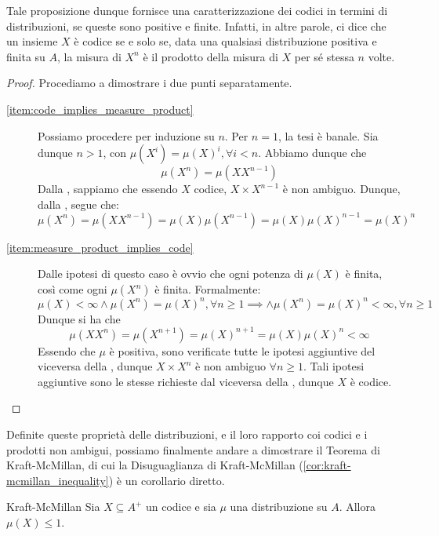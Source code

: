 Tale proposizione dunque fornisce una caratterizzazione dei codici in termini di distribuzioni, se queste sono positive e finite.
Infatti, in altre parole, ci dice che un insieme \(X\) è codice se e solo se, data una qualsiasi distribuzione positiva e finita su \(A\), la misura di \(X^n\) è il prodotto della misura di \(X\) per sé stessa \(n\) volte.
\begin{proof}
  Procediamo a dimostrare i due punti separatamente.
  \begin{description}
    \item[\ref{item:code_implies_measure_product}] Possiamo procedere per induzione su \(n\).
      Per \(n=1\), la tesi è banale.
      Sia dunque \(n>1\), con \(\mu(X^i) = {\mu(X)}^i, \forall i < n\).
      Abbiamo dunque che 
      \[\mu(X^n)=\mu(XX^{n-1})\]
      Dalla , sappiamo che essendo \(X\) codice, \(X \times X^{n-1}\) è non ambiguo.
      Dunque, dalla , segue che:
      \[\mu(X^n)=\mu(XX^{n-1}) = \mu(X)\mu(X^{n-1}) = \mu(X) {\mu(X)}^{n-1} = {\mu(X)}^n\]

    \item[\ref{item:measure_product_implies_code}] Dalle ipotesi di questo caso è ovvio che ogni potenza di \(\mu(X)\) è finita, così come ogni \(\mu(X^n)\) è finita.
    Formalmente:
    \[\mu(X)<\infty \land \mu(X^n) = {\mu(X)}^n, \forall n \geq 1 \implies \land \mu(X^n) = {\mu(X)}^n < \infty, \forall n \geq 1\]
    Dunque si ha che
    \[\mu(XX^n) = \mu(X^{n+1}) = {\mu(X)}^{n+1} = \mu(X){\mu(X)}^n < \infty\]
    Essendo che \(\mu\) è positiva, sono verificate tutte le ipotesi aggiuntive del viceversa della , dunque \(X \times X^n\) è non ambiguo \(\forall n \geq 1\).
    Tali ipotesi aggiuntive sono le stesse richieste dal viceversa della , dunque \(X\) è codice.
  \end{description}
\end{proof}
Definite queste proprietà delle distribuzioni, e il loro rapporto coi codici e i prodotti non ambigui, possiamo finalmente andare a dimostrare il Teorema di Kraft-McMillan, di cui la Disuguaglianza di Kraft-McMillan (\ref{cor:kraft-mcmillan_inequality}) è un corollario diretto.

\begin{theorem}[label=thm:kraft-mcmillan]{Kraft-McMillan}
  Sia \(X \subseteq A^+\) un codice e sia \(\mu\) una distribuzione su \(A\).
  Allora \(\mu(X) \leq 1\).
\end{theorem}

